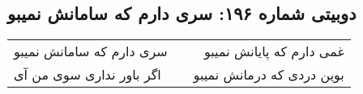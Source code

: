 \begin{center}
\section*{دوبیتی شماره ۱۹۶: سری دارم که سامانش نمیبو}
\label{sec:196}
\begin{longtable}{l p{0.5cm} r}
سری دارم که سامانش نمیبو
&&
غمی دارم که پایانش نمیبو
\\
اگر باور نداری سوی من آی
&&
بوین دردی که درمانش نمیبو
\\
\end{longtable}
\end{center}
